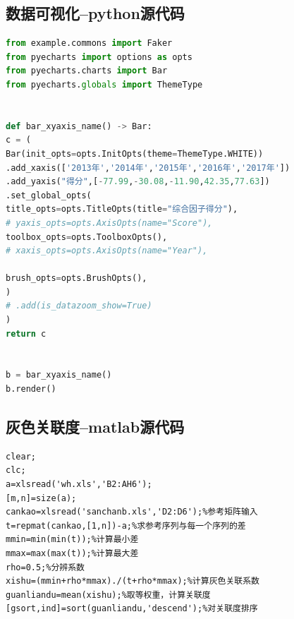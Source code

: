 \documentclass{whutmod}
\begin{document}
\subsection{数据可视化--python源代码}
\begin{lstlisting}[language=python]%这里修改语言
from example.commons import Faker
from pyecharts import options as opts
from pyecharts.charts import Bar
from pyecharts.globals import ThemeType


def bar_xyaxis_name() -> Bar:
c = (
Bar(init_opts=opts.InitOpts(theme=ThemeType.WHITE))
.add_xaxis(['2013年','2014年','2015年','2016年','2017年'])
.add_yaxis("得分",[-77.99,-30.08,-11.90,42.35,77.63])
.set_global_opts(
title_opts=opts.TitleOpts(title="综合因子得分"),
# yaxis_opts=opts.AxisOpts(name="Score"),
toolbox_opts=opts.ToolboxOpts(),
# xaxis_opts=opts.AxisOpts(name="Year"),

brush_opts=opts.BrushOpts(),
)
# .add(is_datazoom_show=True)
)
return c


b = bar_xyaxis_name()
b.render()
\end{lstlisting}
\subsection{灰色关联度--matlab源代码}
\begin{lstlisting}
clear;
clc;
a=xlsread('wh.xls','B2:AH6');
[m,n]=size(a);
cankao=xlsread('sanchanb.xls','D2:D6');%参考矩阵输入
t=repmat(cankao,[1,n])-a;%求参考序列与每一个序列的差
mmin=min(min(t));%计算最小差
mmax=max(max(t));%计算最大差
rho=0.5;%分辨系数
xishu=(mmin+rho*mmax)./(t+rho*mmax);%计算灰色关联系数
guanliandu=mean(xishu);%取等权重，计算关联度
[gsort,ind]=sort(guanliandu,'descend');%对关联度排序
\end{lstlisting}
\end{document}
